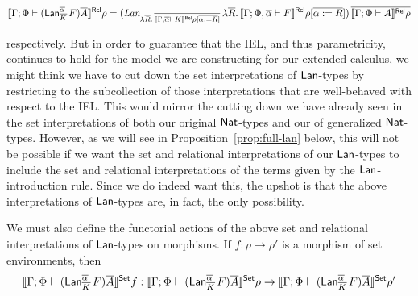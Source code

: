 \documentclass{lmcs}
\theoremstyle{plain}\newtheorem{satz}[thm]{Satz}
\begin{document}
{\vspace*{-0.1in}

\[
  \llbracket{\Gamma;\Phi \vdash
    (\mathsf{Lan}^{\overline{\alpha}}_{\overline{K}}\,F)\overline{A}}\rrbracket^{\mathsf{Rel}}\rho = (
  \textit{Lan}_{\lambda \overline{R}.\,\overline{\llbracket{\Gamma; \overline{\alpha} \vdash
        K}\rrbracket^{\mathsf{Rel}}\rho[\overline{\alpha := R}]}}\, \lambda \overline{R}.\,\llbracket{\Gamma;
    \Phi, \overline{\alpha} \vdash F}\rrbracket^{\mathsf{Rel}}\rho[\overline{\alpha := R}])\,
  \overline{\llbracket{\Gamma; \Phi \vdash A}\rrbracket^{\mathsf{Rel}}\rho}
\]

\vspace*{0.05in}

\noindent
respectively. But in order to guarantee that the IEL, and thus
parametricity, continues to hold for the model we are constructing for
our extended calculus, we might think we have to cut down the set
interpretations of $\mathsf{Lan}$-types by restricting to the subcollection of
those interpretations that are well-behaved with respect to the
IEL. This would mirror the cutting down we have already seen in the
set interpretations of both our original $\mathsf{Nat}$-types and our of
generalized $\mathsf{Nat}$-types. However, as we will see in
Proposition~\ref{prop:full-lan} below, this will not be possible if we
want the set and relational interpretations of our $\mathsf{Lan}$-types to
include the set and relational interpretations of the terms given by
the $\mathsf{Lan}$-introduction rule. Since we do indeed want this, the upshot
is that the above interpretations of $\mathsf{Lan}$-types are, in fact, the
only possibility.

We must also define the functorial actions of the above set and
relational interpretations of $\mathsf{Lan}$-types on morphisms. If $f : \rho
\to \rho'$ is a morphism of set environments, then
\[
\llbracket{\Gamma;\Phi \vdash (\mathsf{Lan}^{\overline{\alpha}}_{\overline{K}}\,F)\overline{A}}\rrbracket^{\mathsf{Set}}f
: \llbracket{\Gamma;\Phi \vdash (\mathsf{Lan}^{\overline{\alpha}}_{\overline{K}}\,F)\overline{A}}\rrbracket^{\mathsf{Set}}\rho
\to \llbracket{\Gamma;\Phi \vdash (\mathsf{Lan}^{\overline{\alpha}}_{\overline{K}}\,F)\overline{A}}\rrbracket^{\mathsf{Set}}\rho'
\]

\vspace*{0.05in}

}
\end{document}

